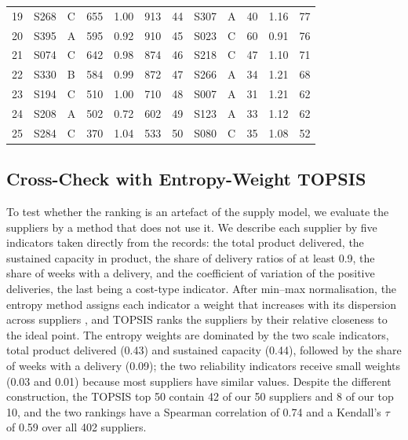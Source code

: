 \documentclass[11pt,a4paper]{article}
\begin{document}
\begin{table}[ht]
\begin{tabular}{rllrrr@{\hspace{14pt}}rllrrr}
19 & S268 & C & 655 & 1.00 & 913 & 44 & S307 & A & 40 & 1.16 & 77 \\
20 & S395 & A & 595 & 0.92 & 910 & 45 & S023 & C & 60 & 0.91 & 76 \\
21 & S074 & C & 642 & 0.98 & 874 & 46 & S218 & C & 47 & 1.10 & 71 \\
22 & S330 & B & 584 & 0.99 & 872 & 47 & S266 & A & 34 & 1.21 & 68 \\
23 & S194 & C & 510 & 1.00 & 710 & 48 & S007 & A & 31 & 1.21 & 62 \\
24 & S208 & A & 502 & 0.72 & 602 & 49 & S123 & A & 33 & 1.12 & 62 \\
25 & S284 & C & 370 & 1.04 & 533 & 50 & S080 & C & 35 & 1.08 & 52 \\
\bottomrule
\end{tabular}
\end{table}

\subsection{Cross-Check with Entropy-Weight TOPSIS}
To test whether the ranking is an artefact of the supply model, we evaluate the suppliers by a method that does not use it.
We describe each supplier by five indicators taken directly from the records: the total product delivered, the sustained capacity in product, the share of delivery ratios of at least 0.9, the share of weeks with a delivery, and the coefficient of variation of the positive deliveries, the last being a cost-type indicator.
After min--max normalisation, the entropy method assigns each indicator a weight that increases with its dispersion across suppliers \citep{hwang1981}, and TOPSIS ranks the suppliers by their relative closeness to the ideal point.
The entropy weights are dominated by the two scale indicators, total product delivered (0.43) and sustained capacity (0.44), followed by the share of weeks with a delivery (0.09); the two reliability indicators receive small weights (0.03 and 0.01) because most suppliers have similar values.
Despite the different construction, the TOPSIS top 50 contain 42 of our 50 suppliers and 8 of our top 10, and the two rankings have a Spearman correlation of 0.74 and a Kendall's $\tau$ of 0.59 over all 402 suppliers.
\end{document}
